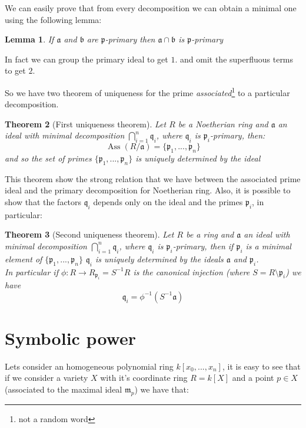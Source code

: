 \documentclass[a4wide]{book}
\theoremstyle{plain}
\newtheorem{teo}{Theorem}[section]
\newtheorem{lem}[teo]{Lemma}
\theoremstyle{remark}
\theoremstyle{definition}
\newcommand{\p}{\mathfrak{p}}
\newcommand{\q}{\mathfrak{q}}
\newcommand{\mm}{\mathfrak{m}}
\newcommand{\A}{\mathfrak{a}}
\newcommand{\B}{\mathfrak{b}}
\DeclareMathOperator{\Ass}{Ass}
\newcounter{que}
\begin{document}
We can easily prove that from every decomposition we can obtain a minimal one using the following lemma:

\begin{lem}
If $ \A $ and $ \B $ are $ \p $-primary then $ \A \cap \B $ is $ \p $-primary
\end{lem}

In fact we can group the primary ideal to get $ 1. $ and omit the superfluous terms to get $ 2. $

So we have two theorem of uniqueness for the prime \textit{associated}\footnote{not a random word} to a particular decomposition. 

\begin{teo}[First uniqueness theorem]
Let $ R $ be a Noetherian ring and $ \A $ an ideal with minimal decomposition $ \bigcap_{i=1}^n \q_i $, where $ \q_i $ is $ \p_i $-primary, then:
\[ \Ass(R/ \A) = \{ \p_1 , ... , \p_n \} \]
and so the set of primes $ \{ \p_1 , ... , \p_n \} $ is uniquely determined by the ideal

\end{teo}

This theorem show the strong relation that we have between the associated prime ideal and the primary decomposition for Noetherian ring. Also, it is possible to show that the factors $ \q_i $ depends only on the ideal and the primes $ \p_i $, in particular:

\begin{teo}[Second uniqueness theorem]
Let $ R $ be a ring and $ \A $ an ideal with minimal decomposition $ \bigcap_{i=1}^n \q_i $, where $ \q_i $ is $ \p_i $-primary, then if $ \p_i $ is a minimal element of $ \{ \p_1 , ... , \p_n \} $ $ \q_i $ is uniquely determined by the ideals $ \A $ and $ \p_i $.\\
In particular if $ \phi : R \to R_{\p_i} = S^{-1} R$ is the canonical injection (where $ S = R \setminus \p_i $) we have
\[ 
\q_i = \phi ^{-1} ( S^{-1} \A  )
\]

\end{teo}


\section{Symbolic power}

	Lets consider an homogeneous polynomial ring $ k[x_0 , ... , x_n] $, it is easy to see that if we consider a variety $ X $ with it's coordinate ring $ R = k[X] $ and a point $ p \in X $ (associated to the maximal ideal $ \mm_p $)  we have that:
	
\end{document}
